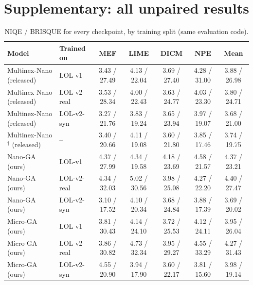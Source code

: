 \documentclass[10pt,twocolumn,letterpaper]{article}
\begin{document}
\section{Supplementary: all unpaired results}
\begin{table}[h]
\centering
\caption{NIQE / BRISQUE for every checkpoint, by training split (same evaluation code).}
\label{tab:noref_all}
\small
\begin{tabular}{llccccc}
\toprule
Model & Trained on & MEF & LIME & DICM & NPE & Mean \\
\midrule
Multinex-Nano (released)          & LOL-v1      & 3.43 / 27.49 & 4.13 / 22.04 & 3.69 / 27.40 & 4.28 / 31.00 & 3.88 / 26.98 \\
Multinex-Nano (released)          & LOL-v2-real & 3.53 / 28.34 & 4.00 / 22.43 & 3.63 / 24.77 & 4.03 / 23.30 & 3.80 / 24.71 \\
Multinex-Nano (released)          & LOL-v2-syn  & 3.27 / 21.76 & 3.83 / 19.24 & 3.65 / 23.94 & 3.97 / 19.07 & 3.68 / 21.00 \\
Multinex-Nano$^\dagger$ (released) & --         & 3.40 / 20.66 & 4.11 / 19.08 & 3.60 / 21.80 & 3.85 / 17.46 & 3.74 / 19.75 \\
\midrule
Nano-GA (ours)                    & LOL-v1      & 4.37 / 27.99 & 4.34 / 19.58 & 4.18 / 23.69 & 4.58 / 21.57 & 4.37 / 23.21 \\
Nano-GA (ours)                    & LOL-v2-real & 4.34 / 32.03 & 5.02 / 30.56 & 3.98 / 25.08 & 4.27 / 22.20 & 4.40 / 27.47 \\
Nano-GA (ours)                    & LOL-v2-syn  & 3.10 / 17.52 & 4.10 / 20.34 & 3.68 / 24.84 & 3.88 / 17.39 & 3.69 / 20.02 \\
\midrule
Micro-GA (ours)                   & LOL-v1      & 3.81 / 30.43 & 4.14 / 24.10 & 3.72 / 25.53 & 4.12 / 24.11 & 3.95 / 26.04 \\
Micro-GA (ours)                   & LOL-v2-real & 3.86 / 30.82 & 4.73 / 32.34 & 3.95 / 29.27 & 4.55 / 33.29 & 4.27 / 31.43 \\
Micro-GA (ours)                   & LOL-v2-syn  & 4.55 / 20.90 & 3.94 / 17.90 & 3.60 / 22.17 & 3.81 / 15.60 & 3.98 / 19.14 \\
\bottomrule
\end{tabular}
\end{table}
\end{document}
